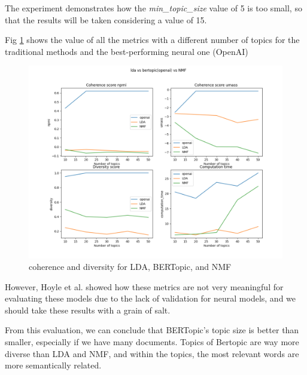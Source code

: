 The experiment demonstrates how the \textit{min\_topic\_size} value of 5 is too small, so that the results will be taken considering a value of 15.

Fig \ref{figure:unsupervised_results} shows the value of all the metrics with a different number of topics for the traditional methods and the best-performing neural one (OpenAI)

\begin{figure}[h]
    \centering %
        \includegraphics[width=0.99\linewidth]{Chapter4/figures/topic_unsupervised.png} 
    \caption{coherence and diversity for LDA, BERTopic, and NMF
    }
    \label{figure:unsupervised_results} 
\end{figure}


However, Hoyle et al. \cite{hoyle_is_2021} showed how these metrics are not very meaningful for evaluating these models due to the lack of validation for neural models, and we should take these results with a grain of salt.

From this evaluation, we can conclude that BERTopic's topic size is better than smaller, especially if we have many documents. Topics of Bertopic are way more diverse than LDA and NMF, and within the topics, the most relevant words are more semantically related.


